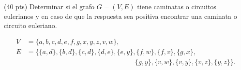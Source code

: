 \documentclass[a4paper,12pt,twoside,spanish]{amsbook}
\begin{document}

\begin{ejercicio}[1] (40 pts) Determinar si el grafo $G=(V, E)$ tiene caminatas o circuitos eulerianos y  en caso de que la respuesta sea positiva encontrar una caminata o circuito euleriano. 

\begin{align*}
    V &= \{a, b, c, d, e, f, g, x, y, z, v, w\},\\
    E &= \{\{a, d\},
    \{b, d\},
    \{c, d\}, 
    \{d, e\},
    \{e, y\}, 
    \{f, w\},
    \{f, v\},
    \{g, x\}, 
    \\
    &\qquad\qquad\qquad\qquad\qquad\qquad\qquad\qquad
    \{g, y\},
    \{v, w\}, 
    \{v, y\}, 
    \{v, z\}, 
    \{y, z\}\}.
\end{align*}
\end{ejercicio}
\end{document}

